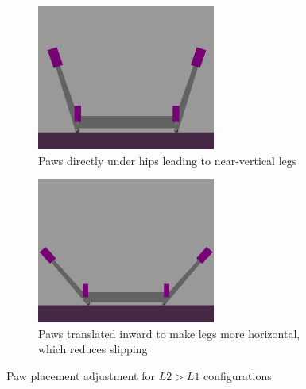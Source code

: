 \begin{figure}[h]
    \centering
    \begin{subfigure}[b]{0.48\textwidth}
        \centering
        \includegraphics[width=\textwidth]{Images/link_length_optimization/symmetric_unadjusted_paws.png}
        \caption{Paws directly under hips leading to near-vertical legs}
    \end{subfigure}
    \hfill
    \begin{subfigure}[b]{0.48\textwidth}
        \centering
        \includegraphics[width=\textwidth]{Images/link_length_optimization/symmetric_adjusted_paws.png}
        \caption{Paws translated inward to make legs more horizontal, which reduces slipping}
    \end{subfigure}
    \caption{Paw placement adjustment for $L2>L1$ configurations}
    \label{fig:link_length_optimization:symmetric_config_adjusted_paws}
\end{figure}


